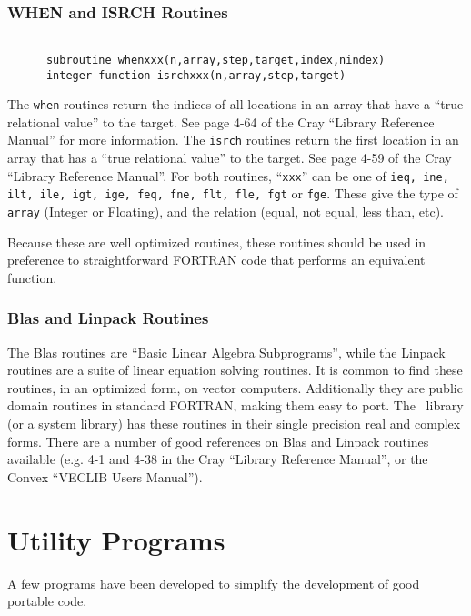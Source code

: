 \subsection{WHEN and ISRCH Routines}
\begin{verbatim}

      subroutine whenxxx(n,array,step,target,index,nindex)
      integer function isrchxxx(n,array,step,target)

\end{verbatim}
The {\tt when} routines return the indices of all locations in an array that
have a ``true relational value'' to the target. See page 4-64 of the
Cray ``Library Reference Manual'' for more information. The {\tt isrch}
routines return the first location in an array that has a ``true
relational value'' to the target. See page 4-59 of the Cray ``Library
Reference Manual''. For both routines, ``{\tt xxx}'' can be one of
{\tt ieq, ine, ilt, ile, igt, ige, feq, fne, flt, fle, fgt} or {\tt fge}.
These give the type of {\tt array} (Integer or Floating), and the relation
(equal, not equal, less than, etc).

Because these are well optimized routines, these routines should be used in
preference to straightforward FORTRAN
code that performs an equivalent function.

\subsection{Blas and Linpack Routines}
The Blas routines are ``Basic Linear Algebra Subprograms'', while the
Linpack routines are a suite of linear equation solving routines. It is
common to find these routines, in an optimized form, on vector computers.
Additionally they are public domain routines in standard FORTRAN, making them
easy to port. The \miriad\ library (or a system library) has
these routines in their single precision real and complex forms.
There are a number of good references on Blas and Linpack routines
available (e.g. 4-1 and 4-38 in the Cray ``Library Reference Manual'',
or the Convex ``VECLIB Users Manual'').

\newchapter
\chapter{Utility Programs}\label{ch:utilities}
A few programs have been developed to simplify the development of good
portable code.

